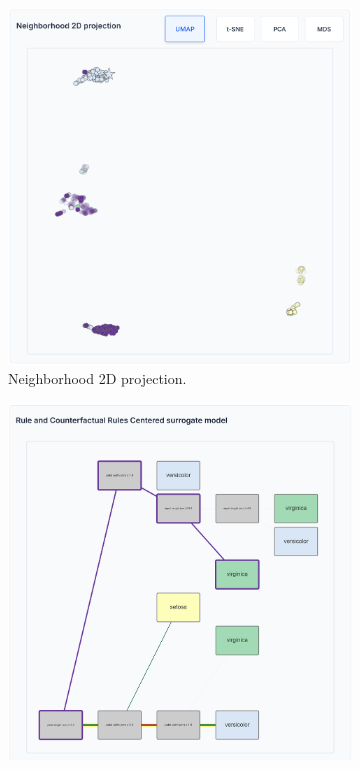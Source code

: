 \begin{figure}[ht]
    \centering
    \begin{subfigure}[c]{0.48\textwidth}
        \includegraphics[width=\textwidth]{images/teaching_blocks_click_alternativeScatter.png}
        \caption{Neighborhood 2D projection.}
    \end{subfigure}
    \hfill
    \begin{subfigure}[c]{0.48\textwidth}
        \includegraphics[width=\textwidth]{images/teaching_blocks_click_alternativeBlocks.png}

\end{subfigure}
\end{figure}

